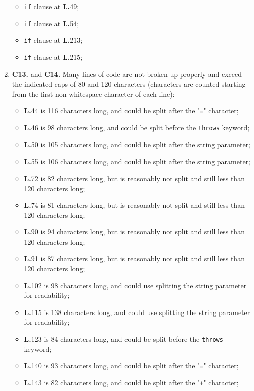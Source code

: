 \begin{enumerate}
	\begin{itemize}
	\item \texttt{if} clause at \textbf{L.}49;
	\item \texttt{if} clause at \textbf{L.}54;
	\item \texttt{if} clause at \textbf{L.}213;
	\item \texttt{if} clause at \textbf{L.}215;
	\end{itemize}
\item \textbf{C13.} and \textbf{C14.} Many lines of code are not broken up properly and exceed the indicated caps of 80 and 120 characters (characters are counted starting from the first non-whitespace character of each line):
	\begin{itemize}
	\item \textbf{L.}44 is 116 characters long, and could be split after the "\texttt{=}" character;
	\item \textbf{L.}46 is 98 characters long, and could be split before the \texttt{throws} keyword;
	\item \textbf{L.}50 is 105 characters long, and could be split after the string parameter;
	\item \textbf{L.}55 is 106 characters long, and could be split after the string parameter;
	\item \textbf{L.}72 is 82 characters long, but is reasonably not split and still less than 120 characters long;
	\item \textbf{L.}74 is 81 characters long, but is reasonably not split and still less than 120 characters long;
	\item \textbf{L.}90 is 94 characters long, but is reasonably not split and still less than 120 characters long;
	\item \textbf{L.}91 is 87 characters long, but is reasonably not split and still less than 120 characters long;
	\item \textbf{L.}102 is 98 characters long, and could use splitting the string parameter for readability;
	\item \textbf{L.}115 is 138 characters long, and could use splitting the string parameter for readability;
	\item \textbf{L.}123 is 84 characters long, and could be split before the \texttt{throws} keyword;
	\item \textbf{L.}140 is 93 characters long, and could be split after the "\texttt{=}" character;
	\item \textbf{L.}143 is 82 characters long, and could be split after the "\texttt{+}" character;

\end{itemize}
\end{enumerate}
